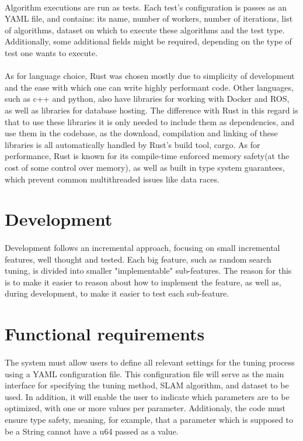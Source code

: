 \paragraph{}Algorithm executions are run as tests. Each test's configuration is passes as an YAML file, and contains: its name, number of workers, number of iterations, list of algorithms, dataset on which to execute these algorithms and the test type. Additionally, some additional fields might be required, depending on the type of test one wants to execute.

\paragraph{}As for language choice, Rust was chosen mostly due to simplicity of development and the ease with which one can write highly performant code. Other languages, such as c++ and python, also have libraries for working with Docker and ROS, as well as libraries for database hosting. The difference with Rust in this regard is that to use these libraries it is only needed to include them as dependencies, and use them in the codebase, as the download, compilation and linking of these libraries is all automatically handled by Rust's build tool, cargo. As for performance, Rust is known for its compile-time enforced memory safety(at the cost of some control over memory), as well as built in type system guarantees, which prevent common multithreaded issues like data races.

\section{Development}
\paragraph{}Development follows an incremental approach, focusing on small incremental features, well thought and tested. Each big feature, such as random search tuning, is divided into smaller "implementable" sub-features. The reason for this is to make it easier to reason about how to implement the feature, as well as, during development, to make it easier to test each sub-feature.

\section{Functional requirements}

\paragraph{}The system must allow users to define all relevant settings for the tuning process using a YAML configuration file. This configuration file will serve as the main interface for specifying the tuning method, SLAM algorithm, and dataset to be used. In addition, it will enable the user to indicate which parameters are to be optimized, with one or more values per parameter. Additionaly, the code must ensure type safety, meaning, for example, that a parameter which is supposed to be a String cannot have a u64 passed as a value.

